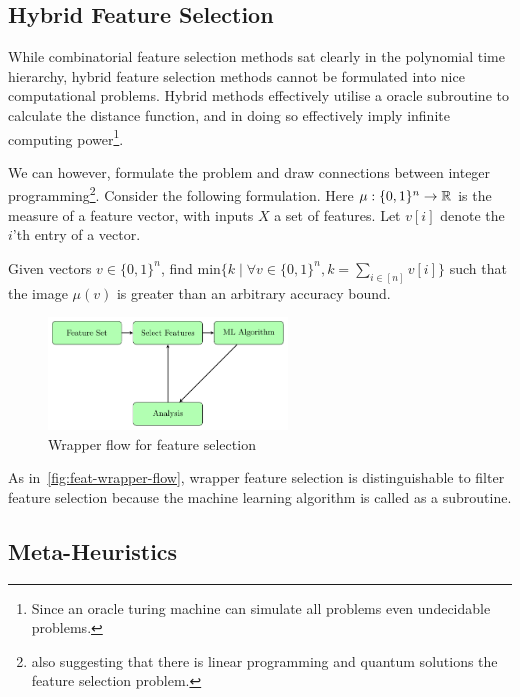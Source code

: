 \documentclass[conference]{IEEEtran}
\begin{document}
\subsection{Hybrid Feature Selection}

While combinatorial feature selection methods sat clearly in the polynomial time hierarchy, hybrid feature selection methods cannot be formulated into nice computational problems. Hybrid methods effectively utilise a oracle subroutine to calculate the distance function, and in doing so effectively imply infinite computing power\footnote{Since an oracle turing machine can simulate all problems even undecidable problems.}.

We can however, formulate the problem and draw connections between integer programming\footnote{also suggesting that there is linear programming and quantum solutions the feature selection problem.}. Consider the following formulation. Here $\mu : \{ 0, 1 \}^{n} \to \mathbb{R}$ is the measure of a feature vector, with inputs $X$ a set of features. Let $v[i]$ denote the $i$'th entry of a vector.

\begin{definition}
	Given vectors $v\in \{0,1\}^{n}$, find $\text{min}\{ k \mid \forall v\in \{0,1\}^{n}, k=\sum_{i\in[n]} v[i] \}$ such that the image $\mu(v)$ is greater than an arbitrary accuracy bound.
\end{definition}

\begin{figure}[h]
	\begin{center}
		\includegraphics[width=2.5in]{wrapper-flow.pdf}
		\caption{Wrapper flow for feature selection}\label{fig:feat-wrapper-flow}
	\end{center}
\end{figure}

As in~\autoref{fig:feat-wrapper-flow}, wrapper feature selection is distinguishable to filter feature selection because the machine learning algorithm is called as a subroutine.

\subsection{Meta-Heuristics}
\end{document}
